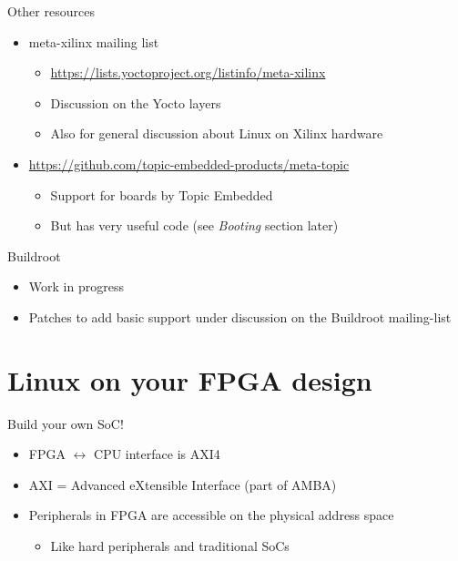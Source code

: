 \documentclass[xetex,table]{beamer}
\begin{document}
\begin{frame}{Other resources}
  \begin{itemize}
  \item meta-xilinx mailing list
    \begin{itemize}
    \item {\footnotesize\url{https://lists.yoctoproject.org/listinfo/meta-xilinx}}
    \item Discussion on the Yocto layers
    \item Also for general discussion about Linux on Xilinx
      hardware
    \end{itemize}
  \item {\small\url{https://github.com/topic-embedded-products/meta-topic}}
    \begin{itemize}
    \item Support for boards by Topic Embedded
    \item But has very useful code (see {\em Booting} section later)
    \end{itemize}
  \end{itemize}
\end{frame}

\begin{frame}{Buildroot}
  \begin{itemize}
  \item Work in progress
  \item Patches to add basic support under discussion on the Buildroot
    mailing-list
  \end{itemize}
\end{frame}

\section{Linux on your FPGA design}

\begin{frame}{Build your own SoC!}
  \begin{itemize}
  \item FPGA $\leftrightarrow$ CPU interface is AXI4
  \item AXI = Advanced eXtensible Interface (part of AMBA)
  \item Peripherals in FPGA are accessible on the physical address
    space
    \begin{itemize}
    \item Like hard peripherals and traditional SoCs
    \end{itemize}
  \end{itemize}
\end{frame}
\end{document}
